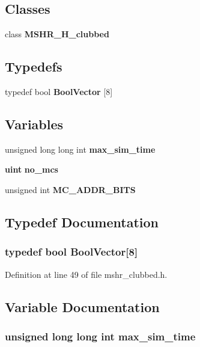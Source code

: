 \subsection*{Classes}
\begin{CompactItemize}
\item 
class {\bf MSHR\_\-H\_\-clubbed}
\end{CompactItemize}
\subsection*{Typedefs}
\begin{CompactItemize}
\item 
typedef bool {\bf BoolVector} [8]
\end{CompactItemize}
\subsection*{Variables}
\begin{CompactItemize}
\item 
unsigned long long int {\bf max\_\-sim\_\-time}
\item 
{\bf uint} {\bf no\_\-mcs}
\item 
unsigned int {\bf MC\_\-ADDR\_\-BITS}
\end{CompactItemize}


\subsection{Typedef Documentation}
\subsubsection[{BoolVector}]{\setlength{\rightskip}{0pt plus 5cm}typedef bool {\bf BoolVector}[8]}\label{mshr__clubbed_8h_06efeb479cce937a4455bf62cdea657c}




Definition at line 49 of file mshr\_\-clubbed.h.

\subsection{Variable Documentation}
\subsubsection[{max\_\-sim\_\-time}]{\setlength{\rightskip}{0pt plus 5cm}unsigned long long int {\bf max\_\-sim\_\-time}}\label{mshr__clubbed_8h_35eb3b8621b39fb3b39217f5fb55bb31}




